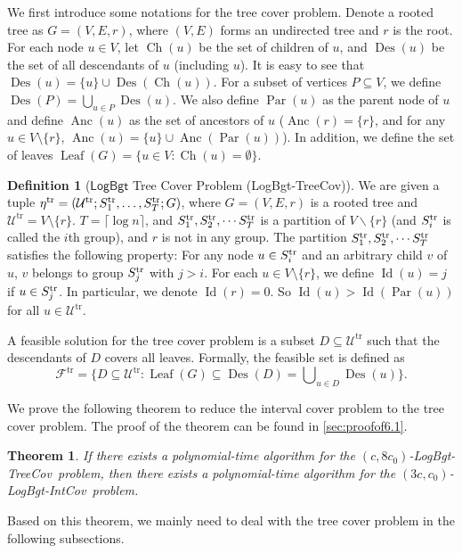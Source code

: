\documentclass[11pt,a4paper]{article} \usepackage{enumitem}
\newcommand{\calF}{\mathcal{F}}
\newcommand{\calU}{\mathcal{U}}
\newcommand{\LBO}{\textsf{LogBgt}}
\newcommand{\LBOintcov}{\textsf{LogBgt-IntCov}}
\newcommand{\LBOtreecov}{\textsf{LogBgt-TreeCov}}
\newcommand{\trU}{\operatorname{\calU^{tr}}}
\newcommand{\trS}[1]{\ifx\relax#1\relax
    S^{\operatorname{tr}} \else
    S^{\operatorname{tr}}_{#1} \fi
}
\newcommand{\trF}{\operatorname{\calF^{tr}}}
\newcommand{\treta}{\operatorname{\eta^{tr}}}
\newcommand{\Des}{\operatorname{Des}}
\newcommand{\Ch}{\operatorname{Ch}}
\newcommand{\Anc}{\operatorname{Anc}}
\newcommand{\Leaf}{\operatorname{Leaf}}
\newcommand{\Lev}{\operatorname{Id}}
\newcommand{\Par}{\operatorname{Par}}
\newtheorem{theorem}{Theorem}[section]
\theoremstyle{definition}
\newtheorem{definition}{Definition}[section]
\begin{document}
We first introduce some notations for the tree cover problem. Denote a rooted tree as $G = (V, E, r)$, where $(V, E)$ forms an undirected tree and $r$ is the root. For each node $u \in V$, let $\Ch(u)$ be the set of children of $u$, and $\Des(u)$ be the set of all descendants of $u$ (including $u$). 
It is easy to see that $\Des(u) = \{u\} \cup \Des(\Ch(u))$.
For a subset of vertices
$P \subseteq V$, we define $\Des(P) = \bigcup_{u \in P} \Des(u)$. 
We also define $\Par(u)$ as the parent node of $u$ and define $\Anc(u)$ as the set of ancestors of $u$ ($\Anc(r) = \{r\}$, and for any $u \in V \setminus \{r\}$, $\Anc(u) = \{u\} \cup \Anc(\Par(u))$). In addition, we define the set of leaves $\Leaf(G) = \{u \in V : \Ch(u) = \emptyset\}$.

\begin{definition}[$\LBO$ Tree Cover Problem (\LBOtreecov)]
We are given a tuple $\treta=(\trU;\trS{1},\ldots,\trS{T};G)$, where $G=(V,E,r)$ is a rooted tree and $\trU = V \setminus \{r\}$. $T=\lceil \log n\rceil$, and $\trS{1},\trS{2},\cdots \trS{T}$ is a partition of $V\backslash\{r\}$ (and $\trS{i}$ 
is called the $i$th group), and $r$ is not in any group. 
The partition $\trS{1},\trS{2},\cdots \trS{T}$ 
satisfies the following property:
For any node $u\in \trS{i}$ and an arbitrary child $v$ of $u$,
$v$ belongs to group $\trS{j}$ with $j>i$.
For each $u \in V \setminus \{r\}$, we define $\Lev(u) = j$ if $u \in \trS{j}$. In particular, we denote $\Lev(r) = 0$. So $\Lev(u) > \Lev(\Par(u))$ for all $u \in \trU$.

A feasible solution for the tree cover problem is 
a subset $D \subseteq \trU$ such that the descendants of $D$ covers all leaves. Formally, the feasible set is defined as
$$
\trF = \{D \subseteq \trU : \Leaf(G) \subseteq \Des(D)=\bigcup\nolimits_{u \in D} \Des(u)\}.
$$
\end{definition}

We prove the following theorem to reduce the interval cover problem to the tree cover problem. The proof of the theorem can be found in \cref{sec:proofof6.1}.

\begin{theorem}\label{thm:inter-to-tree}
If there exists a polynomial-time algorithm for the $(c, 8c_0)$-\LBOtreecov\ problem, then there exists a polynomial-time algorithm for the $(3c, c_0)$-\LBOintcov\ problem.
\end{theorem}



Based on this theorem, we mainly need to deal with the tree cover problem in the following subsections.
\end{document}
